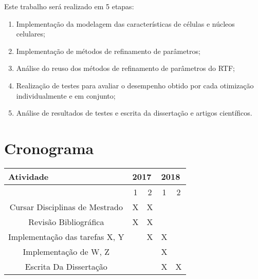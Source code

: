 \documentclass[a4paper,10pt]{article}
\begin{document}
Este trabalho será realizado em 5 etapas:
\begin{enumerate}
	\item Implementação da modelagem das características de células e núcleos celulares;
	\item Implementação de métodos de refinamento de parâmetros;
	\item Análise do reuso dos métodos de refinamento de parâmetros do RTF;
	\item Realização de testes para avaliar o desempenho obtido por cada otimização individualmente e em conjunto;
	\item Análise de resultados de testes e escrita da dissertação e artigos científicos.
\end{enumerate}


\section{Cronograma}
\begin{table}[!h]
	\centering
	\label{my-label}
	\begin{tabular}{|c|c|c|c|c|}
		\hline
		\multicolumn{1}{|l|}{Atividade} & \multicolumn{2}{l|}{2017} & \multicolumn{2}{l|}{2018} \\ \hline
		& 1\degree    & 2\degree    & 1\degree    & 2\degree    \\ \hline
		Cursar Disciplinas de Mestrado  & X           &  X           &             &             \\ \hline
		Revisão Bibliográfica           & X           & X           &             &             \\ \hline
		Implementação das tarefas X, Y  &             & X           & X           &             \\ \hline
		Implementação de W, Z     &             &             & X           &             \\ \hline
		Escrita Da Dissertação          &             &             & X           & X           \\ \hline
	\end{tabular}
\end{table}




\newcommand{\BIBdecl}{\setlength{\itemsep}{0.2 em}}
\linespread{0.9}
	
\begin{scriptsize}

\end{scriptsize}	
\end{document}
